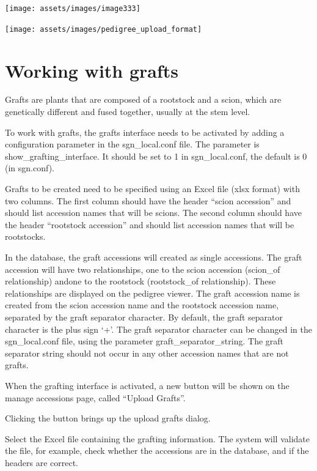 \documentclass[
  12pt,
]{book}
\begin{document}
\begin{center}\texttt{[image: assets/images/image333]} \end{center}

\begin{center}\texttt{[image: assets/images/pedigree\_upload\_format]} \end{center}

\hypertarget{working-with-grafts}{%
\section{Working with grafts}\label{working-with-grafts}}

Grafts are plants that are composed of a rootstock and a scion, which are genetically different and fused together, usually at the stem level.

To work with grafts, the grafts interface needs to be activated by adding a configuration parameter in the sgn\_local.conf file. The parameter is show\_grafting\_interface. It should be set to 1 in sgn\_local.conf, the default is 0 (in sgn.conf).

Grafts to be created need to be specified using an Excel file (xlsx format) with two columns. The first column should have the header ``scion accession'' and should list accession names that will be scions. The second column should have the header ``rootstock accession'' and should list accession names that will be rootstocks.

In the database, the graft accessions will created as single accessions. The graft accession will have two relationships, one to the scion accession (scion\_of relationship) andone to the rootstock (rootstock\_of relationship). These relationships are displayed on the pedigree viewer. The graft accession name is created from the scion accession name and the rootstock accession name, separated by the graft separator character. By default, the graft separator character is the plus sign `+'. The graft separator character can be changed in the sgn\_local.conf file, using the parameter graft\_separator\_string. The graft separator string should not occur in any other accession names that are not grafts.

When the grafting interface is activated, a new button will be shown on the manage accessions page, called ``Upload Grafts''.

Clicking the button brings up the upload grafts dialog.

Select the Excel file containing the grafting information. The system will validate the file, for example, check whether the accessions are in the database, and if the headers are correct.
\end{document}
